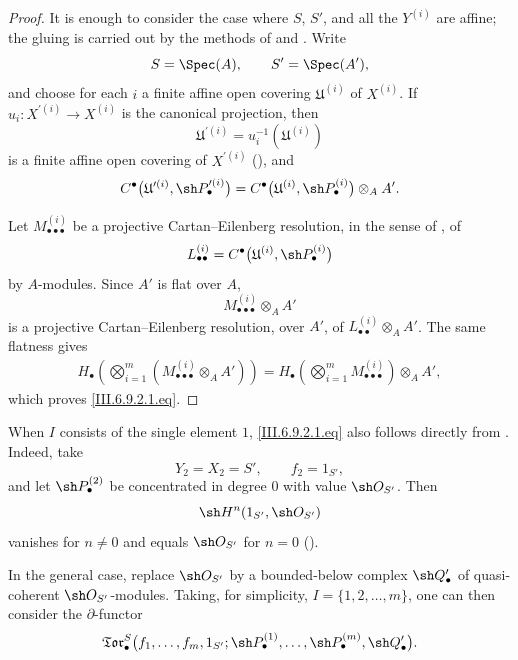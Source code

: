 \begin{proof}
It is enough to consider the case where $S$, $S'$, and all the
$Y^{(i)}$ are affine; the gluing is carried out by the methods of
 and .  Write
\[
  S=\Spec(A),
  \qquad
  S'=\Spec(A'),
\]
and choose for each $i$ a finite affine open covering
$\mathfrak U^{(i)}$ of $X^{(i)}$.  If
$u_i:X^{\prime(i)}\to X^{(i)}$ is the canonical projection, then
\[
  \mathfrak U^{\prime(i)}
  =
  u_i^{-1}(\mathfrak U^{(i)})
\]
is a finite affine open covering of $X^{\prime(i)}$
(), and
\[
  C^\bullet
  \bigl(
    \mathfrak U^{\prime(i)},\sh P_\bullet^{\prime(i)}
  \bigr)
  =
  C^\bullet
  \bigl(
    \mathfrak U^{(i)},\sh P_\bullet^{(i)}
  \bigr)
  \otimes_AA'.
\]

Let $M_{\bullet\bullet\bullet}^{(i)}$ be a projective
Cartan--Eilenberg resolution, in the sense of
, of
\[
  L_{\bullet\bullet}^{(i)}
  =
  C^\bullet
  \bigl(
    \mathfrak U^{(i)},\sh P_\bullet^{(i)}
  \bigr)
\]
by $A$-modules.  Since $A'$ is flat over $A$,
\[
  M_{\bullet\bullet\bullet}^{(i)}\otimes_AA'
\]
is a projective Cartan--Eilenberg resolution, over $A'$, of
$L_{\bullet\bullet}^{(i)}\otimes_AA'$.  The same flatness gives
\[
\begin{split}
  H_\bullet
  \left(
    \bigotimes_{i=1}^{m}
    (M_{\bullet\bullet\bullet}^{(i)}\otimes_AA')
  \right)
  =
  H_\bullet
  \left(
    \bigotimes_{i=1}^{m}
    M_{\bullet\bullet\bullet}^{(i)}
  \right)
  \otimes_AA',
\end{split}
\]
which proves \eqref{III.6.9.2.1.eq}.
\end{proof}

\begin{env}[6.9.2.2]
\label{III.6.9.2.2}
When $I$ consists of the single element $1$,
\eqref{III.6.9.2.1.eq} also follows directly from
.  Indeed, take
\[
  Y_2=X_2=S',
  \qquad
  f_2=1_{S'},
\]
and let $\sh P_\bullet^{(2)}$ be concentrated in degree $0$ with
value $\sh O_{S'}$.  Then
\[
  \sh H^n(1_{S'},\sh O_{S'})
\]
vanishes for $n\neq0$ and equals $\sh O_{S'}$ for $n=0$
().
\end{env}

In the general case, replace $\sh O_{S'}$ by a bounded-below
complex $\sh Q_\bullet'$ of quasi-coherent
$\sh O_{S'}$-modules.  Taking, for simplicity,
$I=\{1,2,\ldots,m\}$, one can then consider the
$\partial$-functor
\[
  \mathfrak{Tor}_\bullet^S
  \bigl(
    f_1,\ldots,f_m,1_{S'};
    \sh P_\bullet^{(1)},\ldots,\sh P_\bullet^{(m)},
    \sh Q_\bullet'
  \bigr).
\]


